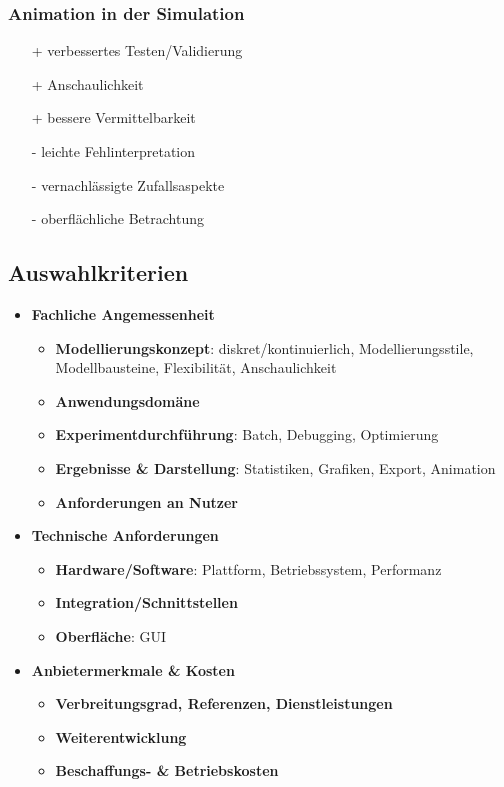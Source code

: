 \documentclass{article}
\begin{document}
\subsubsection{Animation in der Simulation}
\begin{itemize}
  \item[+] verbessertes Testen/Validierung
  \item[+] Anschaulichkeit
  \item[+] bessere Vermittelbarkeit
  \item[-] leichte Fehlinterpretation
  \item[-] vernachlässigte Zufallsaspekte
  \item[-] oberflächliche Betrachtung
\end{itemize}

\subsection{Auswahlkriterien}
\begin{itemize}
  \item \textbf{Fachliche Angemessenheit}
        \begin{itemize}
          \item \textbf{Modellierungskonzept}: diskret/kontinuierlich, Modellierungsstile, Modellbausteine, Flexibilität, Anschaulichkeit
          \item \textbf{Anwendungsdomäne}
          \item \textbf{Experimentdurchführung}: Batch, Debugging, Optimierung
          \item \textbf{Ergebnisse \& Darstellung}: Statistiken, Grafiken, Export, Animation
          \item \textbf{Anforderungen an Nutzer}
        \end{itemize}
  \item \textbf{Technische Anforderungen}
        \begin{itemize}
          \item \textbf{Hardware/Software}: Plattform, Betriebssystem, Performanz
          \item \textbf{Integration/Schnittstellen}
          \item \textbf{Oberfläche}: GUI
        \end{itemize}
  \item \textbf{Anbietermerkmale \& Kosten}
        \begin{itemize}
          \item \textbf{Verbreitungsgrad, Referenzen, Dienstleistungen}
          \item \textbf{Weiterentwicklung}
          \item \textbf{Beschaffungs- \& Betriebskosten}
        \end{itemize}
\end{itemize}
\end{document}
